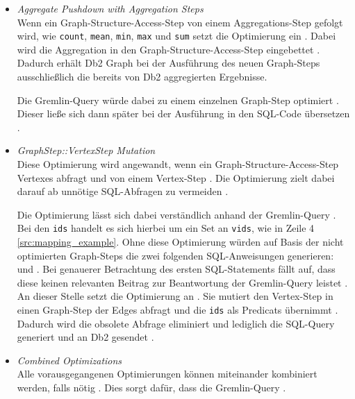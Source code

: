 \begin{itemize}
    \item \textit{Aggregate Pushdown with Aggregation Steps}\\
    Wenn ein Graph-Structure-Access-Step von einem Aggregations-Step gefolgt wird, wie \texttt{count}, \texttt{mean}, \texttt{min}, \texttt{max} und \texttt{sum} setzt die Optimierung ein \cite{sigmod_tian}. Dabei wird die Aggregation in den Graph-Structure-Access-Step eingebettet \cite{sigmod_tian}. Dadurch erhält Db2 Graph bei der Ausführung des neuen Graph-Steps ausschließlich die bereits von Db2 aggregierten Ergebnisse.
    
    Die Gremlin-Query  würde dabei zu einem einzelnen Graph-Step optimiert \cite{sigmod_tian}. Dieser ließe sich dann später bei der Ausführung in den SQL-Code  übersetzen \cite{sigmod_tian}.

    \item \textit{GraphStep::VertexStep Mutation}\\
    Diese Optimierung wird angewandt, wenn ein Graph-Structure-Access-Step Vertexes abfragt und von einem Vertex-Step \cite{sigmod_tian}. Die Optimierung zielt dabei darauf ab unnötige SQL-Abfragen zu vermeiden \cite{sigmod_tian}. 

    Die Optimierung lässt sich dabei verständlich anhand der Gremlin-Query  \cite{sigmod_tian}. Bei den \texttt{ids} handelt es sich hierbei um ein Set an \texttt{vids}, wie in Zeile 4 \autoref{src:mapping_example}. Ohne diese Optimierung würden auf Basis der nicht optimierten Graph-Steps die zwei folgenden SQL-Anweisungen generieren:  und  \cite{sigmod_tian}. Bei genauerer Betrachtung des ersten SQL-Statements fällt auf, dass diese keinen relevanten Beitrag zur Beantwortung der Gremlin-Query leistet \cite{sigmod_tian}. An dieser Stelle setzt die Optimierung an \cite{sigmod_tian}. Sie mutiert den Vertex-Step in einen Graph-Step der Edges abfragt und die \texttt{ids} als Predicats übernimmt \cite{sigmod_tian}. Dadurch wird die obsolete Abfrage eliminiert und lediglich die SQL-Query  generiert und an Db2 gesendet \cite{sigmod_tian}.

    \item \textit{Combined Optimizations}\\
    Alle vorausgegangenen Optimierungen können miteinander kombiniert werden, falls nötig \cite{sigmod_tian}. Dies sorgt dafür, dass die Gremlin-Query  .
\end{itemize}

